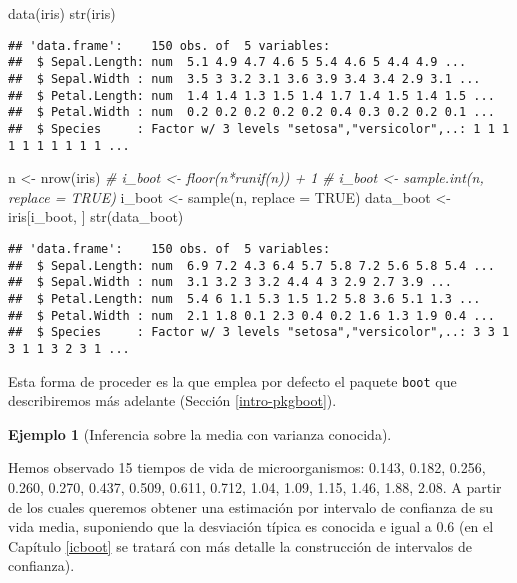 \documentclass[
]{book}
\newenvironment{Shaded}{\begin{snugshade}}{\end{snugshade}}
\newcommand{\AttributeTok}[1]{\textcolor[rgb]{0.77,0.63,0.00}{#1}}
\newcommand{\CommentTok}[1]{\textcolor[rgb]{0.56,0.35,0.01}{\textit{#1}}}
\newcommand{\ConstantTok}[1]{\textcolor[rgb]{0.00,0.00,0.00}{#1}}
\newcommand{\FunctionTok}[1]{\textcolor[rgb]{0.00,0.00,0.00}{#1}}
\newcommand{\NormalTok}[1]{#1}
\newcommand{\OtherTok}[1]{\textcolor[rgb]{0.56,0.35,0.01}{#1}}
\theoremstyle{break}
\theoremstyle{definition}
\theoremstyle{definition}
\newtheorem{example}{Ejemplo}[chapter]
\theoremstyle{definition}
\theoremstyle{definition}
\theoremstyle{remark}
\begin{document}
\begin{Shaded}
\begin{Highlighting}[]
\FunctionTok{data}\NormalTok{(iris)}
\FunctionTok{str}\NormalTok{(iris)}
\end{Highlighting}
\end{Shaded}

\begin{verbatim}
## 'data.frame':    150 obs. of  5 variables:
##  $ Sepal.Length: num  5.1 4.9 4.7 4.6 5 5.4 4.6 5 4.4 4.9 ...
##  $ Sepal.Width : num  3.5 3 3.2 3.1 3.6 3.9 3.4 3.4 2.9 3.1 ...
##  $ Petal.Length: num  1.4 1.4 1.3 1.5 1.4 1.7 1.4 1.5 1.4 1.5 ...
##  $ Petal.Width : num  0.2 0.2 0.2 0.2 0.2 0.4 0.3 0.2 0.2 0.1 ...
##  $ Species     : Factor w/ 3 levels "setosa","versicolor",..: 1 1 1 1 1 1 1 1 1 1 ...
\end{verbatim}

\begin{Shaded}
\begin{Highlighting}[]
\NormalTok{n }\OtherTok{\textless{}{-}} \FunctionTok{nrow}\NormalTok{(iris)}
\CommentTok{\# i\_boot \textless{}{-} floor(n*runif(n)) + 1}
\CommentTok{\# i\_boot \textless{}{-} sample.int(n, replace = TRUE)}
\NormalTok{i\_boot }\OtherTok{\textless{}{-}} \FunctionTok{sample}\NormalTok{(n, }\AttributeTok{replace =} \ConstantTok{TRUE}\NormalTok{)}
\NormalTok{data\_boot }\OtherTok{\textless{}{-}}\NormalTok{ iris[i\_boot, ]}
\FunctionTok{str}\NormalTok{(data\_boot)}
\end{Highlighting}
\end{Shaded}

\begin{verbatim}
## 'data.frame':    150 obs. of  5 variables:
##  $ Sepal.Length: num  6.9 7.2 4.3 6.4 5.7 5.8 7.2 5.6 5.8 5.4 ...
##  $ Sepal.Width : num  3.1 3.2 3 3.2 4.4 4 3 2.9 2.7 3.9 ...
##  $ Petal.Length: num  5.4 6 1.1 5.3 1.5 1.2 5.8 3.6 5.1 1.3 ...
##  $ Petal.Width : num  2.1 1.8 0.1 2.3 0.4 0.2 1.6 1.3 1.9 0.4 ...
##  $ Species     : Factor w/ 3 levels "setosa","versicolor",..: 3 3 1 3 1 1 3 2 3 1 ...
\end{verbatim}

Esta forma de proceder es la que emplea por defecto el paquete \texttt{boot} que
describiremos más adelante (Sección \ref{intro-pkgboot}).

\begin{example}[Inferencia sobre la media con varianza conocida]
\protect\hypertarget{exm:media-dt-conocida}{}{\label{exm:media-dt-conocida} \iffalse (Inferencia sobre la media con varianza conocida) \fi{} }
\vspace{0.5cm}

Hemos observado 15 tiempos de vida de microorganismos:
0.143, 0.182, 0.256, 0.260, 0.270, 0.437, 0.509,
0.611, 0.712, 1.04, 1.09, 1.15, 1.46, 1.88, 2.08.
A partir de los cuales queremos
obtener una estimación por intervalo de confianza de su vida media,
suponiendo que la desviación típica es conocida e igual a 0.6
(en el Capítulo \ref{icboot} se tratará con más detalle la construcción de intervalos de confianza).
\end{example}
\end{document}
